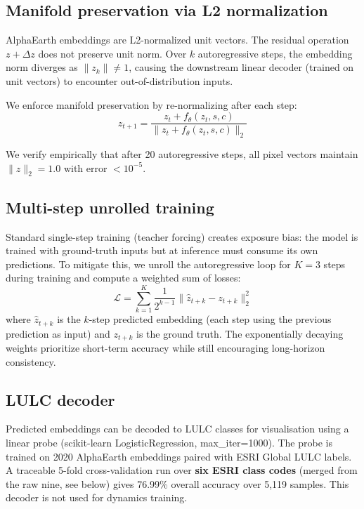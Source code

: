 \documentclass{article}
\begin{document}
\subsection{Manifold preservation via L2 normalization}
\label{sec:manifold}

AlphaEarth embeddings are L2-normalized unit vectors. The residual operation $z + \Delta z$ does not preserve unit norm. Over $k$ autoregressive steps, the embedding norm diverges as $\|z_k\| \neq 1$, causing the downstream linear decoder (trained on unit vectors) to encounter out-of-distribution inputs.

We enforce manifold preservation by re-normalizing after each step:
\begin{equation}
z_{t+1} = \frac{z_t + f_\theta(z_t, s, c)}{\|z_t + f_\theta(z_t, s, c)\|_2}
\end{equation}

We verify empirically that after 20 autoregressive steps, all pixel vectors maintain $\|z\|_2 = 1.0$ with error $<10^{-5}$.

\subsection{Multi-step unrolled training}
\label{sec:multistep}

Standard single-step training (teacher forcing) creates exposure bias: the model is trained with ground-truth inputs but at inference must consume its own predictions. To mitigate this, we unroll the autoregressive loop for $K=3$ steps during training and compute a weighted sum of losses:
\begin{equation}
\mathcal{L} = \sum_{k=1}^{K} \frac{1}{2^{k-1}} \|\hat{z}_{t+k} - z_{t+k}\|_2^2
\end{equation}
where $\hat{z}_{t+k}$ is the $k$-step predicted embedding (each step using the previous prediction as input) and $z_{t+k}$ is the ground truth. The exponentially decaying weights prioritize short-term accuracy while still encouraging long-horizon consistency.

\subsection{LULC decoder}

Predicted embeddings can be decoded to LULC classes for visualisation using a linear probe (scikit-learn LogisticRegression, max\_iter=1000). The probe is trained on 2020 AlphaEarth embeddings paired with ESRI Global LULC labels. A traceable 5-fold cross-validation run over \textbf{six ESRI class codes} (merged from the raw nine, see below) gives 76.99\% overall accuracy over 5{,}119 samples. This decoder is not used for dynamics training.
\end{document}

